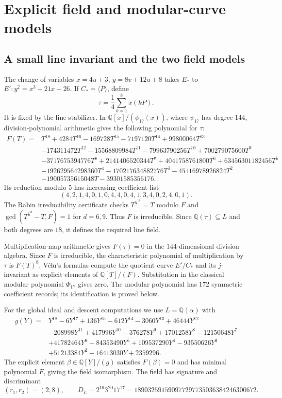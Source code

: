 \documentclass[11pt,a4paper]{article}
\theoremstyle{definition}\newtheorem{definition}[theorem]{Definition}
\theoremstyle{remark}\newtheorem{remark}[theorem]{Remark}
\newcommand{\Q}{\mathbb Q}\newcommand{\Z}{\mathbb Z}\newcommand{\F}{\mathbb F}
\begin{document}
\section{Explicit field and modular-curve models}\label{sec:field}

\subsection{A small line invariant and the two field models}

The change of variables $x=4u+3$, $y=8v+12u+8$ takes $E_*$ to
$E':y^2=x^3+21x-26$. If $C_*=\langle P\rangle$, define
\[
\tau=\frac14\sum_{k=1}^{8}x(kP).
\]
It is fixed by the line stabilizer. In
$\Q[x]/(\psi_{17}(x))$, where $\psi_{17}$ has degree $144$,
division-polynomial arithmetic gives the following polynomial for $\tau$:
\begin{align*}
F(T)={}&T^{18}+4284T^{16}-169728T^{15}-7197120T^{14}
 +99800064T^{13}\\
&-174311472T^{12}-15568809984T^{11}-79963790256T^{10}
 +700279075600T^9\\
&-3717675394776T^8+2141406520344T^7+4041758761800T^6
 +63456301182456T^5\\
&-192629564298360T^4-170217634882776T^3
 -45116978926824T^2\\
&-19005735615048T-39301585356176.
\end{align*}
Its reduction modulo $5$ has increasing coefficient list
\[
(4,2,1,4,0,1,0,4,4,0,4,1,3,4,0,2,4,0,1).
\]
The Rabin irreducibility certificate checks $T^{5^{18}}=T$ modulo $F$
and $\gcd(T^{5^d}-T,F)=1$ for $d=6,9$. Thus $F$ is irreducible.
Since $\Q(\tau)\subseteq L$ and both degrees are $18$, it defines the
required line field.

Multiplication-map arithmetic gives $F(\tau)=0$ in
the $144$-dimensional division algebra. Since $F$ is irreducible, the
characteristic polynomial of multiplication by $\tau$ is $F(T)^8$.
V\'elu's formulas compute the quotient curve
$E'/C_*$ and its $j$-invariant as explicit elements of $\Q[T]/(F)$.
Substitution in the classical modular polynomial $\Phi_{17}$ gives zero.
The modular polynomial has $172$ symmetric coefficient records; its identification is proved below.

For the global ideal and descent computations we use $L=\Q(\alpha)$ with
\begin{align*}
g(Y)={}&Y^{18}-6Y^{17}+136Y^{15}-612Y^{14}-3060Y^{13}
 +46444Y^{12}\\
&-208998Y^{11}+417996Y^{10}-376278Y^9+1701258Y^8
 -12150648Y^7\\
&+41782464Y^6-84353490Y^5+109537290Y^4-93550626Y^3\\
&+51213384Y^2-16413030Y+2359296.
\end{align*}
The explicit element $\beta\in\Q[Y]/(g)$ satisfies $F(\beta)=0$ and
has minimal polynomial $F$, giving the field isomorphism. The field has signature and discriminant
\begin{equation}\label{eq:disc}
(r_1,r_2)=(2,8),\qquad
D_L=2^{16}3^{20}17^{17}
=189032591590977297735036384246300672.
\end{equation}
\end{document}
